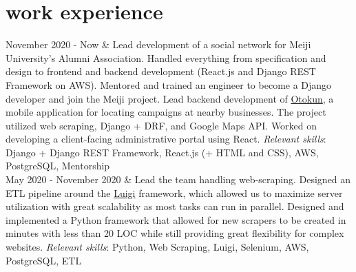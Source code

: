 \documentclass[]{cv-roald}
\begin{document}
\section*{work experience}
\begin{tabularcv}
  November 2020 - Now   & 
                    \newline Lead development of a social network for Meiji University's Alumni Association. Handled everything from specification and design to frontend and backend development (React.js and Django REST Framework on AWS). 
                    \newline Mentored and trained an engineer to become a Django developer and join the Meiji project.
                    \newline Lead backend development of \href{https://www.otokun.jp/}{Otokun}, a mobile application for locating campaigns at nearby businesses. The project utilized web scraping, Django + DRF, and Google Maps API. Worked on developing a client-facing administrative portal using React. 
                    \newline \textit{Relevant skills}: Django + Django REST Framework, React.js (+ HTML and CSS), AWS, PostgreSQL, Mentorship
                    \\[\vspacepar]
  May 2020 - November 2020   & 
                    \newline Lead the team handling web-scraping. Designed an ETL pipeline around the \href{https://luigi.readthedocs.io/en/stable/}{Luigi} framework, which allowed us to maximize server utilization with great scalability as most tasks can run in parallel.
                    \newline Designed and implemented a Python framework that allowed for new scrapers to be created in minutes with less than 20 LOC while still providing great flexibility for complex websites.
                    \newline \textit{Relevant skills}: Python, Web Scraping, Luigi, Selenium, AWS, PostgreSQL, ETL
                    \\[\vspacepar]

\end{tabularcv}
\end{document}
